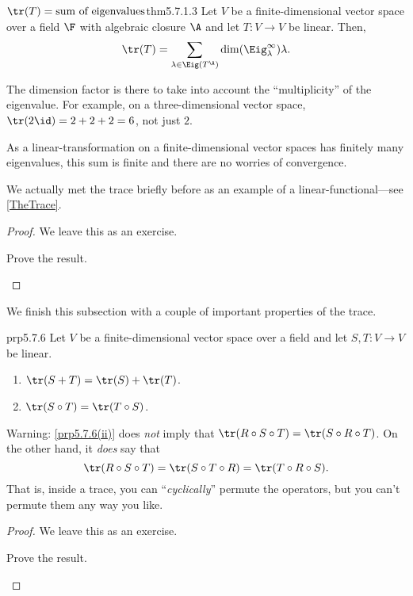 \begin{thm}{$\tr (T)=\text{sum of eigenvalues}$}{thm5.7.1.3}
	Let $V$ be a finite-dimensional vector space over a field $\F$ with algebraic closure $\A$ and let $T\colon V\rightarrow V$ be linear.  Then,
	\begin{equation}
		\tr (T)=\sum _{\lambda \in \Eig (T^{\A})}\dim (\Eig _{\lambda}^{\infty})\lambda .
	\end{equation}
	\begin{rmk}
		The dimension factor is there to take into account the ``multiplicity'' of the eigenvalue.  For example, on a three-dimensional vector space, $\tr (2\id )=2+2+2=6$, not just $2$.
	\end{rmk}
	\begin{rmk}
		As a linear-transformation on a finite-dimensional vector spaces has finitely many eigenvalues, this sum is finite and there are no worries of convergence.
	\end{rmk}
	\begin{rmk}
		We actually met the trace briefly before as an example of a linear-functional---see \cref{TheTrace}.
	\end{rmk}
	\begin{proof}
		We leave this as an exercise.
		\begin{exr}[breakable=false]{}{}
			Prove the result.
		\end{exr}
	\end{proof}
\end{thm}
We finish this subsection with a couple of important properties of the trace.
\begin{prp}{}{prp5.7.6}
	Let $V$ be a finite-dimensional vector space over a field and let $S,T\colon V\rightarrow V$ be linear.
	\begin{enumerate}
		\item \label{prp5.7.6(i)}$\tr (S+T)=\tr (S)+\tr (T)$.
		\item \label{prp5.7.6(ii)}$\tr (S\circ T)=\tr (T\circ S)$.
	\end{enumerate}
	\begin{rmk}
		Warning:  \cref{prp5.7.6(ii)} does \emph{not} imply that $\tr (R\circ S\circ T)=\tr (S\circ R\circ T)$.  On the other hand, it \emph{does} say that
		\begin{equation}
			\tr (R\circ S\circ T)=\tr (S\circ T\circ R)=\tr (T\circ R\circ S).
		\end{equation}
		That is, inside a trace, you can ``\emph{cyclically}'' permute the operators, but you can't permute them any way you like.
	\end{rmk}
	\begin{proof}
		We leave this as an exercise.
		\begin{exr}[breakable=false]{}{}
			Prove the result.
		\end{exr}
	\end{proof}
\end{prp}

